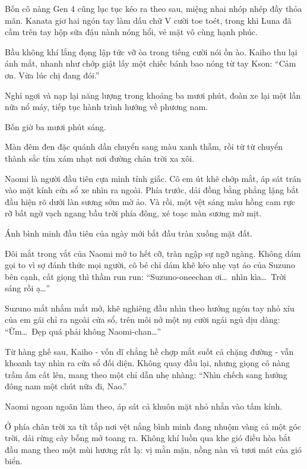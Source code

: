 \documentclass[../main.tex]{subfiles}
\begin{document}
Bốn cô nàng Gen 4 cũng lục tục kéo ra theo sau, miệng nhai nhóp nhép đầy thỏa mãn. Kanata giơ hai ngón tay làm dấu chữ V cười toe toét, trong khi Luna đã cầm trên tay hộp sữa đậu nành nóng hổi, vẻ mặt vô cùng hạnh phúc.

Bầu không khí lắng đọng lập tức vỡ òa trong tiếng cười nói ồn ào. Kaiho thu lại ánh mắt, nhanh như chớp giật lấy một chiếc bánh bao nóng từ tay Kson: ``Cảm ơn. Vừa lúc chị đang đói.''

Nghỉ ngơi và nạp lại năng lượng trong khoảng ba mươi phút, đoàn xe lại một lần nữa nổ máy, tiếp tục hành trình hướng về phương nam.

\ct

Bốn giờ ba mươi phút sáng.

Màn đêm đen đặc quánh dần chuyển sang màu xanh thẫm, rồi từ từ chuyển thành sắc tím xám nhạt nơi đường chân trời xa xôi.

Naomi là người đầu tiên cựa mình tỉnh giấc. Cô em út khẽ chớp mắt, áp sát trán vào mặt kính cửa sổ xe nhìn ra ngoài. Phía trước, dải đồng bằng phẳng lặng bắt đầu hiện rõ dưới làn sương sớm mờ ảo. Và rồi, một vệt sáng màu hồng cam rực rỡ bất ngờ vạch ngang bầu trời phía đông, xé toạc màn sương mờ mịt.

Ánh bình minh đầu tiên của ngày mới bắt đầu tràn xuống mặt đất.

Đôi mắt trong vắt của Naomi mở to hết cỡ, tràn ngập sự ngỡ ngàng. Không dám gọi to vì sợ đánh thức mọi người, cô bé chỉ dám khẽ kéo nhẹ vạt áo của Suzuno bên cạnh, cất giọng thì thầm run run: ``Suzuno-oneechan ơi\dots\ nhìn kìa\dots\ Trời sáng rồi ạ\dots''

Suzuno mắt nhắm mắt mở, khẽ nghiêng đầu nhìn theo hướng ngón tay nhỏ xíu của em gái chỉ ra ngoài cửa sổ, trên môi nở một nụ cười ngái ngủ dịu dàng: ``Ừm\dots\ Đẹp quá phải không Naomi-chan\dots''

Từ hàng ghế sau, Kaiho - vốn dĩ chẳng hề chợp mắt suốt cả chặng đường - vẫn khoanh tay nhìn ra cửa sổ đối diện. Không quay đầu lại, nhưng giọng cô nàng trầm ấm cất lên, mang theo một chỉ dẫn nhẹ nhàng: ``Nhìn chếch sang hướng đông nam một chút nữa đi, Nao.''

Naomi ngoan ngoãn làm theo, áp sát cả khuôn mặt nhỏ nhắn vào tấm kính.

Ở phía chân trời xa tít tắp nơi vệt nắng bình minh đang nhuộm vàng cả một góc trời, dải rừng cây bỗng mở toang ra. Không khí luồn qua khe gió điều hòa bắt đầu mang theo một mùi hương rất lạ: vị mằn mặn, nồng nàn và tươi mát của gió biển.
\end{document}
